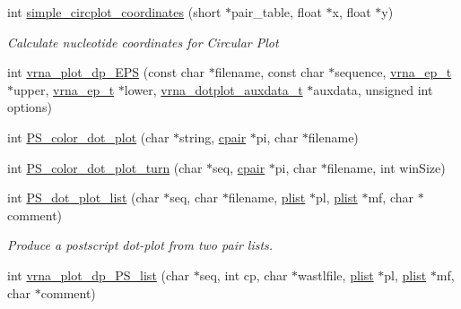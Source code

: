 \begin{DoxyCompactItemize}
int \mbox{\hyperlink{group__plotting__utils_gac4ea13d35308f09940178d2b05a248c2}{simple\+\_\+circplot\+\_\+coordinates}} (short $\ast$pair\+\_\+table, float $\ast$x, float $\ast$y)
\begin{DoxyCompactList}\small\item\em Calculate nucleotide coordinates for {\itshape Circular Plot} \end{DoxyCompactList}\item 
int \mbox{\hyperlink{group__plotting__utils_ga45e56b67e3f333f4335197737b5f9822}{vrna\+\_\+plot\+\_\+dp\+\_\+\+E\+PS}} (const char $\ast$filename, const char $\ast$sequence, \mbox{\hyperlink{group__struct__utils_gab9ac98ab55ded9fb90043b024b915aca}{vrna\+\_\+ep\+\_\+t}} $\ast$upper, \mbox{\hyperlink{group__struct__utils_gab9ac98ab55ded9fb90043b024b915aca}{vrna\+\_\+ep\+\_\+t}} $\ast$lower, \mbox{\hyperlink{group__plotting__utils_structvrna__dotplot__auxdata__t}{vrna\+\_\+dotplot\+\_\+auxdata\+\_\+t}} $\ast$auxdata, unsigned int options)
\item 
int \mbox{\hyperlink{group__plotting__utils_ga2f6294599b0fbe8338bec6918c3b1ba7}{P\+S\+\_\+color\+\_\+dot\+\_\+plot}} (char $\ast$string, \mbox{\hyperlink{group__data__structures_ga8412f116a2eb07b59ade9e14ca7c5ef1}{cpair}} $\ast$pi, char $\ast$filename)
\item 
int \mbox{\hyperlink{group__plotting__utils_gab3e6bb8fac08c07b32883ae2049aed9d}{P\+S\+\_\+color\+\_\+dot\+\_\+plot\+\_\+turn}} (char $\ast$seq, \mbox{\hyperlink{group__data__structures_ga8412f116a2eb07b59ade9e14ca7c5ef1}{cpair}} $\ast$pi, char $\ast$filename, int win\+Size)
\item 
int \mbox{\hyperlink{group__plotting__utils_ga00ea223b5cf02eb2faae5ff29f0d5e12}{P\+S\+\_\+dot\+\_\+plot\+\_\+list}} (char $\ast$seq, char $\ast$filename, \mbox{\hyperlink{group__data__structures_ga9608eed021ebfbdd7a901cfdc446c8e9}{plist}} $\ast$pl, \mbox{\hyperlink{group__data__structures_ga9608eed021ebfbdd7a901cfdc446c8e9}{plist}} $\ast$mf, char $\ast$comment)
\begin{DoxyCompactList}\small\item\em Produce a postscript dot-\/plot from two pair lists. \end{DoxyCompactList}\item 
int \mbox{\hyperlink{group__plotting__utils_ga3921213b67eb931daeb24451e989f8de}{vrna\+\_\+plot\+\_\+dp\+\_\+\+P\+S\+\_\+list}} (char $\ast$seq, int cp, char $\ast$wastlfile, \mbox{\hyperlink{group__data__structures_ga9608eed021ebfbdd7a901cfdc446c8e9}{plist}} $\ast$pl, \mbox{\hyperlink{group__data__structures_ga9608eed021ebfbdd7a901cfdc446c8e9}{plist}} $\ast$mf, char $\ast$comment)

\end{DoxyCompactItemize}
